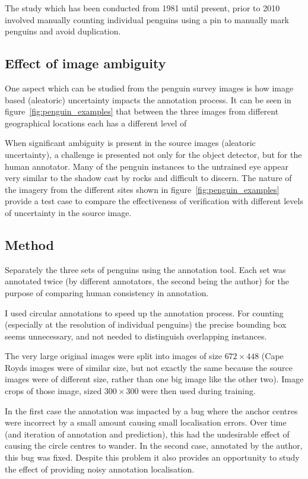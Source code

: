 The study which has been conducted from 1981 until present, prior to 2010 involved manually counting individual penguins using a pin to manually mark penguins and avoid duplication. 


\subsection {Effect of image ambiguity}

One aspect which can be studied from the penguin survey images is how image based (aleatoric) uncertainty impacts the annotation process. It can be seen in figure~\ref{fig:penguin_examples} that between the three images from different geographical locations each has a different level of 

When significant ambiguity is present in the source images (aleatoric uncertainty), a challenge is presented not only for the object detector, but for the human annotator. Many of the penguin instances to the untrained eye appear very similar to the shadow cast by rocks and difficult to discern. The nature of the imagery from the different sites shown in figure~\ref{fig:penguin_examples} provide a test case to compare the effectiveness of verification with different levels of uncertainty in the source image. 

\subsection {Method}

Separately the three sets of penguins using the annotation tool. Each set was annotated twice (by different annotators, the second being the author) for the purpose  of comparing human consistency in annotation.

I used circular annotations to speed up the annotation process. For counting (especially at the resolution of individual penguins) the precise bounding box seems unnecessary, and not needed to distinguish overlapping instances. 

The very large original images were split into images of size $ 672\times448 $ (Cape Royds images were of similar size, but not exactly the same because the source images were of different size, rather than one big image like the other two). Image crops of those image, sized $ 300\times300 $ were then used during training.

In the first case the annotation was impacted by a bug where the anchor centres were incorrect by a small amount causing small localisation errors. Over time (and iteration of annotation and prediction), this had the undesirable effect of causing the circle centres to wander. In the second case, annotated by the author, this bug was fixed. Despite this problem it also provides an opportunity to study the effect of providing noisy annotation localisation.


